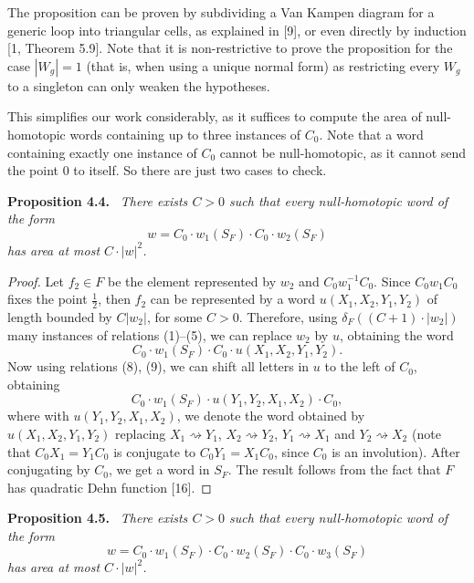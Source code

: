 \documentclass[10pt,a4paper]{article}
\newcommand{\sourcepagenumber}{editorial cover}
\newcommand{\SourcePage}[1]{\clearpage\gdef\sourcepagenumber{#1}}
\newenvironment{authorstatement}[1]{\par\medskip\noindent\textbf{#1}\ \itshape}{\par\medskip}
\begin{document}
The proposition can be proven by subdividing a Van Kampen diagram for a generic loop into triangular cells, as explained in [9], or even directly by induction [1, Theorem 5.9]. Note that it is non-restrictive to prove the proposition for the case $|W_g|=1$ (that is, when using a unique normal form) as restricting every $W_g$ to a singleton can only weaken the hypotheses.

This simplifies our work considerably, as it suffices to compute the area of null-homotopic words containing up to three instances of $C_0$. Note that a word containing exactly one instance of $C_0$ cannot be null-homotopic, as it cannot send the point $0$ to itself. So there are just two cases to check.
\begin{authorstatement}{Proposition 4.4.}
There exists $C>0$ such that every null-homotopic word of the form
\[
w=C_0\cdot w_1(S_F)\cdot C_0\cdot w_2(S_F)
\]
has area at most $C\cdot|w|^2$.
\end{authorstatement}
\begin{proof}
Let $f_2\in F$ be the element represented by $w_2$ and $C_0w_1^{-1}C_0$. Since $C_0w_1C_0$ fixes the point $\frac12$, then $f_2$ can be represented by a word $u(X_1,X_2,Y_1,Y_2)$ of length bounded by $C|w_2|$, for some $C>0$. Therefore, using $\delta_F((C+1)\cdot|w_2|)$ many instances of relations (1)--(5), we can replace $w_2$ by $u$, obtaining the word
\[
C_0\cdot w_1(S_F)\cdot C_0\cdot u(X_1,X_2,Y_1,Y_2).
\]
\SourcePage{8}
\noindent Now using relations (8), (9), we can shift all letters in $u$ to the left of $C_0$, obtaining
\[
C_0\cdot w_1(S_F)\cdot u(Y_1,Y_2,X_1,X_2)\cdot C_0,
\]
where with $u(Y_1,Y_2,X_1,X_2)$, we denote the word obtained by $u(X_1,X_2,Y_1,Y_2)$ replacing $X_1\rightsquigarrow Y_1$, $X_2\rightsquigarrow Y_2$, $Y_1\rightsquigarrow X_1$ and $Y_2\rightsquigarrow X_2$ (note that $C_0X_1=Y_1C_0$ is conjugate to $C_0Y_1=X_1C_0$, since $C_0$ is an involution). After conjugating by $C_0$, we get a word in $S_F$. The result follows from the fact that $F$ has quadratic Dehn function [16].
\end{proof}
\begin{authorstatement}{Proposition 4.5.}
There exists $C>0$ such that every null-homotopic word of the form
\[
w=C_0\cdot w_1(S_F)\cdot C_0\cdot w_2(S_F)\cdot C_0\cdot w_3(S_F)
\]
has area at most $C\cdot|w|^2$.
\end{authorstatement}
\end{document}
